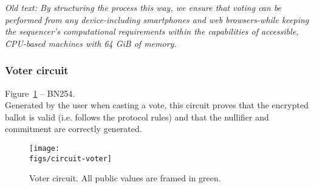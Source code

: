 \textit{Old text: By structuring the process this way, we ensure that voting can be performed from any device-including smartphones and web browsers-while keeping the sequencer's computational requirements within the capabilities of accessible, CPU-based machines with 64 GiB of memory.}




\newpage
\subsubsection{Voter circuit} 

Figure~\ref{fig:circuit-voter} -- BN254.\\

\noi Generated by the user when casting a vote, this circuit proves that the encrypted ballot is valid (i.e. follows the protocol rules) and that the nullifier and commitment are correctly generated.

\begin{figure}[H]
	\centerline{\texttt{[image: \\figs/circuit-voter]}}
	\caption{Voter circuit. All public values are framed in green.}
	\label{fig:circuit-voter}
\end{figure}

